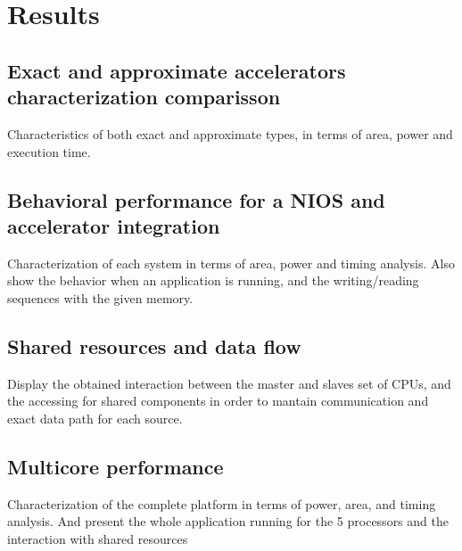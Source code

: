 \chapter{Results}
\label{ch:results}

\section{Exact and approximate accelerators characterization comparisson}

Characteristics of both exact and approximate types, in terms of area, power and execution time.

\section{Behavioral performance for a NIOS and accelerator integration}

Characterization of each system in terms of area, power and timing analysis. Also show the behavior when an application is running, and the writing/reading sequences with the given memory.

\section{Shared resources and data flow}

Display the obtained interaction between the master and slaves set of CPUs, and the accessing for shared components in order to mantain communication and exact data path for each source.

\section{Multicore performance}

Characterization of the complete platform in terms of power, area, and timing analysis. And present the whole application running for the 5 processors and the interaction with shared resources